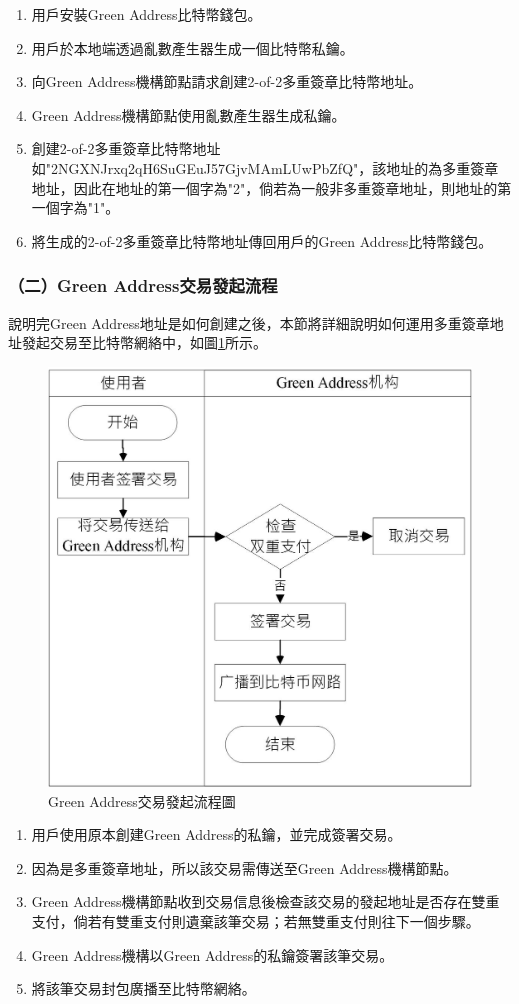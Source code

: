 			 	\begin{enumerate}
			 		\item 用戶安裝Green Address比特幣錢包。
			 		\item 用戶於本地端透過亂數產生器生成一個比特幣私鑰。
			 		\item 向Green Address機構節點請求創建2-of-2多重簽章比特幣地址。
			 		\item Green Address機構節點使用亂數產生器生成私鑰。
					\item 創建2-of-2多重簽章比特幣地址如"2NGXNJrxq2qH6SuGEuJ57GjvMAmLUwPbZfQ"，該地址的為多重簽章地址，因此在地址的第一個字為"2"，倘若為一般非多重簽章地址，則地址的第一個字為"1"。
					\item 將生成的2-of-2多重簽章比特幣地址傳回用戶的Green Address比特幣錢包。
			 	\end{enumerate}

			 	\subsubsection{（二）Green Address交易發起流程}
			 	說明完Green Address地址是如何創建之後，本節將詳細說明如何運用多重簽章地址發起交易至比特幣網絡中，如圖\ref{gatx}所示。

			 	\begin{figure}[!htbp]
					\centering
					\includegraphics[width = .5\textwidth]{gatx.jpg}
					\caption{Green Address交易發起流程圖}\label{gatx}
				\end{figure}

				\begin{enumerate}
					\item 用戶使用原本創建Green Address的私鑰，並完成簽署交易。
					\item 因為是多重簽章地址，所以該交易需傳送至Green Address機構節點。
					\item Green Address機構節點收到交易信息後檢查該交易的發起地址是否存在雙重支付，倘若有雙重支付則遺棄該筆交易；若無雙重支付則往下一個步驟。
					\item Green Address機構以Green Address的私鑰簽署該筆交易。
					\item 將該筆交易封包廣播至比特幣網絡。
				\end{enumerate}

